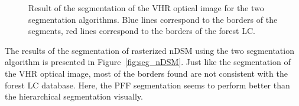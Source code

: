 \begin{figure}[htbp]
\begin{center}
\begingroup
\captionsetup[subfigure]{width=0.4\textwidth}
\hspace*{0.05\textwidth}
\endgroup
\caption{Result of the segmentation of the VHR optical image for the two segmentation algorithms. Blue lines correspond to the borders of the segments, red lines correspond to the borders of the forest LC.}
\label{fig:seg_im}
\end{center}
\end{figure}

The results of the segmentation of rasterized nDSM using the two segmentation algorithm is presented in Figure~\ref{fig:seg_nDSM}. Just like the segmentation of the VHR optical image, most of the borders found are not consistent with the forest LC database. Here, the PFF segmentation seems to perform better than the hierarchical segmentation visually.


